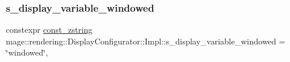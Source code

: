 \subsubsection{\texorpdfstring{s\+\_\+display\+\_\+variable\+\_\+windowed}{s\_display\_variable\_windowed}}
{\footnotesize\ttfamily constexpr \hyperlink{namespacemage_abfd9206dc607ceb5d13ec68bf075a5c0}{const\+\_\+zstring} mage\+::rendering\+::\+Display\+Configurator\+::\+Impl\+::s\+\_\+display\+\_\+variable\+\_\+windowed = \char`\"{}windowed\char`\"{}\hspace{0.3cm}{\ttfamily [static]}, {\ttfamily [private]}}

